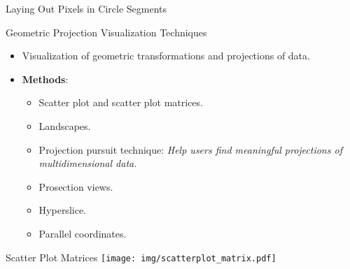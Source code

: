 \begin{frame}{Laying Out Pixels in Circle Segments}
\end{frame}

\begin{frame}{Geometric Projection Visualization Techniques}
	\begin{itemize}
		\item Visualization of geometric transformations and projections of data.
		\item \textbf{Methods}:
		      \begin{itemize}
			      \item Scatter plot and scatter plot matrices.
			      \item Landscapes.
			      \item Projection pursuit technique: \emph{Help users find meaningful projections of multidimensional data.}
			      \item Prosection views.
			      \item Hyperslice.
			      \item Parallel coordinates.
		      \end{itemize}
	\end{itemize}
\end{frame}

\begin{frame}{Scatter Plot Matrices}
	\centering
	\texttt{[image: img/scatterplot\_matrix.pdf]}
\end{frame}

